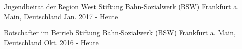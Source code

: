 

\begin{cventries}

  \cventry
    {Jugendbeirat der Region West} %
    {Stiftung Bahn-Sozialwerk (BSW)} %
    {Frankfurt a. Main, Deutschland} %
    {Jan. 2017 - Heute} %
    {
    }
    \vspace{-4.0mm}

  \cventry
    {Botschafter im Betrieb} %
    {Stiftung Bahn-Sozialwerk (BSW)} %
    {Frankfurt a. Main, Deutschland} %
    {Okt. 2016 - Heute} %
    {
    }
    \vspace{-4.0mm}
\end{cventries}
